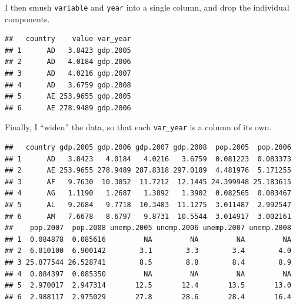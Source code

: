\documentclass[12pt,oneside,openany]{book}
\newenvironment{Shaded}{\begin{snugshade}}{\end{snugshade}}
\newcommand{\KeywordTok}[1]{\textcolor[rgb]{0.13,0.29,0.53}{\textbf{{#1}}}}
\newcommand{\DataTypeTok}[1]{\textcolor[rgb]{0.13,0.29,0.53}{{#1}}}
\newcommand{\StringTok}[1]{\textcolor[rgb]{0.31,0.60,0.02}{{#1}}}
\newcommand{\NormalTok}[1]{{#1}}
\begin{document}
I then smush \texttt{variable} and \texttt{year} into a single column,
and drop the individual components.

\begin{Shaded}
\end{Shaded}

\begin{verbatim}
##   country    value var_year
## 1      AD   3.8423 gdp.2005
## 2      AD   4.0184 gdp.2006
## 3      AD   4.0216 gdp.2007
## 4      AD   3.6759 gdp.2008
## 5      AE 253.9655 gdp.2005
## 6      AE 278.9489 gdp.2006
\end{verbatim}

Finally, I ``widen'' the data, so that each \texttt{var\_year} is a
column of its own.

\begin{Shaded}
\end{Shaded}

\begin{verbatim}
##   country gdp.2005 gdp.2006 gdp.2007 gdp.2008  pop.2005  pop.2006
## 1      AD   3.8423   4.0184   4.0216   3.6759  0.081223  0.083373
## 2      AE 253.9655 278.9489 287.8318 297.0189  4.481976  5.171255
## 3      AF   9.7630  10.3052  11.7212  12.1445 24.399948 25.183615
## 4      AG   1.1190   1.2687   1.3892   1.3902  0.082565  0.083467
## 5      AL   9.2684   9.7718  10.3483  11.1275  3.011487  2.992547
## 6      AM   7.6678   8.6797   9.8731  10.5544  3.014917  3.002161
##    pop.2007  pop.2008 unemp.2005 unemp.2006 unemp.2007 unemp.2008
## 1  0.084878  0.085616         NA         NA         NA         NA
## 2  6.010100  6.900142        3.1        3.3        3.4        4.0
## 3 25.877544 26.528741        8.5        8.8        8.4        8.9
## 4  0.084397  0.085350         NA         NA         NA         NA
## 5  2.970017  2.947314       12.5       12.4       13.5       13.0
## 6  2.988117  2.975029       27.8       28.6       28.4       16.4
\end{verbatim}
\end{document}
